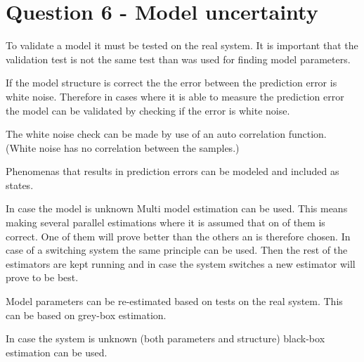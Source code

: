 \chapter{Question 6 - Model uncertainty}

To validate a model it must be tested on the real system. It is important that the validation test is not the same test than was used for finding model parameters. 

If the model structure is correct the the error between the prediction error is white noise. Therefore in cases where it is able to measure the prediction error the model can be validated by checking if the error is white noise. 

The white noise check can be made by use of an auto correlation function. (White noise has no correlation between the samples.)


Phenomenas that results in prediction errors can be modeled and included as states. 

In case the model is unknown Multi model estimation can be used. This means making several parallel estimations where it is assumed that on of them is correct. One of them will prove better than the others an is therefore chosen. In case of a switching system the same principle can be used. Then the rest of the estimators are kept running and in case the system switches a new estimator will prove to be best. 

Model parameters can be re-estimated based on tests on the real system. This can be based on grey-box estimation. 

In case the system is unknown (both parameters and structure) black-box estimation can be used. 